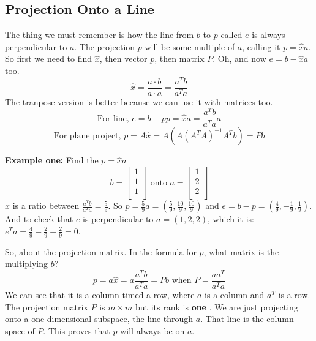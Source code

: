 \subsection{Projection Onto a Line}

The thing we must remember is how the line from \(b\) to \(p\) called \(e\) is always perpendicular to \(a\). The projection \(p\) will be some multiple of \(a\), calling it \(p = \hat{x}a\). So first we need to find \(\hat{x}\), then vector \(p\), then matrix \(P\). Oh, and now \(e = b - \hat{x}a \) too. 
\[
    \hat{x} = \frac{a \cdot b}{a \cdot a} = \frac{a^{T}b}{a^{T}a}
\]          
The tranpose version is better because we can use it with matrices too. 
\[
    \text{For line, }
    e = b - p 
    p = \hat{x}a = \frac{a^{T}b}{a^{T}a}a
\] 
\[
    \text{For plane project, }
    p = A\hat{x} = A(A(A^{T}A)^{-1}A^{T}b) = Pb
\]

\textbf{Example one:} Find the \(p = \hat{x}a\)
\[
    b = 
    \begin{bmatrix}
         1 \\
         1 \\
         1 \\
    \end{bmatrix}
    \text{ onto }
    a = 
    \begin{bmatrix}
         1 \\
         2 \\
         2 \\
    \end{bmatrix}
\]  
\(\hat{x}\) is a ratio between \(\frac{a^{T}b}{a^{T}a} = \frac{5}{9}\). So \(p = \frac{5}{9}a = (\frac{5}{9}, \frac{10}{9}, \frac{10}{9})\) and \(e = b - p = (\frac{4}{9}, -\frac{1}{9}, \frac{1}{9})\). 
And to check that \(e\) is perpendicular to \(a = (1, 2, 2)\), which it is: \(e^{T}a = \frac{4}{9} - \frac{2}{9} - \frac{2}{9}= 0 \). 

So, about the projection matrix. In the formula for \(p\), what matrix is the multiplying \(b\)?
\[
    p = a\hat{x} = a\frac{a^{T}b}{a^{T}a} = Pb
    \text{ when }
    P = \frac{aa^T}{a^{T}a}
\]  
We can see that it is a column timed a row, where \(a\) is a column and \(a^T\) is a row. The projection matrix \(P\) is \(m \times m\) but its rank is \textbf{one} . We are just projecting onto a one-dimensional subspace, the line through \(a\). That line is the column space of \(P\). This proves that \(p\) will always be on \(a\). 

